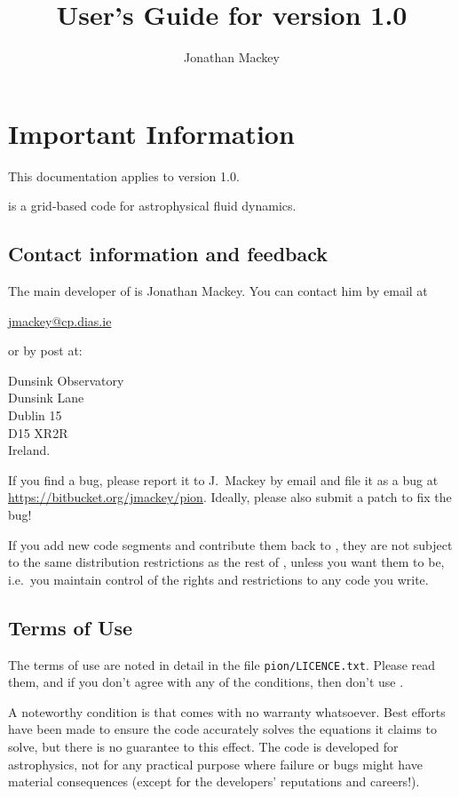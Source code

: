 \documentclass[a4paper,11pt]{report}
\title{User's Guide for \pion{} version 1.0}
\author{Jonathan Mackey}
\begin{document}
\maketitle


\section*{Important Information}
This documentation applies to \pion{} version 1.0.

\pion{} is a grid-based code for astrophysical fluid dynamics.

\subsection*{Contact information and feedback}
The main developer of \pion{} is Jonathan Mackey.
You can contact him by email at

\hangindent=0.5cm
\quad \url{jmackey@cp.dias.ie}

or by post at:

\hangindent=0.5cm
\quad Dunsink Observatory\\
\quad Dunsink Lane\\
\quad Dublin 15\\
\quad D15 XR2R\\
\quad Ireland.

If you find a bug, please report it to J.~Mackey by email and file it as a bug at \href{https://bitbucket.org/jmackey/pion}{https://bitbucket.org/jmackey/pion}.
Ideally, please also submit a patch to fix the bug!

If you add new code segments and contribute them back to \pion{}, they are not subject to the same distribution restrictions as the rest of \pion{}, unless you want them to be, i.e.~you maintain control of the rights and restrictions to any code you write.


\subsection*{Terms of Use}
The terms of use are noted in detail in the file \texttt{pion/LICENCE.txt}.
Please read them, and if you don't agree with any of the conditions, then don't use \pion{}.

A noteworthy condition is that \pion{} comes with no warranty whatsoever.
Best efforts have been made to ensure the code accurately solves the equations it claims to solve, but there is no guarantee to this effect.
The code is developed for astrophysics, not for any practical purpose where failure or bugs might have material consequences (except for the developers' reputations and careers!).
\end{document}
